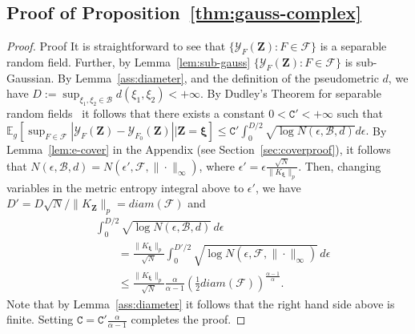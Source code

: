 \documentclass[11pt,leqno]{amsart}
\begin{document}
\subsection{Proof of Proposition~\ref{thm:gauss-complex}}
\begin{proof}{Proof}
It is straightforward to see that $\{\mathcal{Y}_F(\mathbf Z) : F \in \mathcal F\}$ is a separable random field. Further, by Lemma~\ref{lem:sub-gauss} $\{\mathcal{Y}_F(\mathbf Z) : F \in \mathcal F\}$ is sub-Gaussian. By Lemma~\ref{ass:diameter}, and the definition of the pseudometric $d$, we have $ D := \sup_{\xi_1,\xi_2 \in \mathcal{B}} d(\xi_1,\xi_2) < +\infty$. By Dudley's Theorem for separable random fields~\citep[Ch. 11]{Ledoux_1991} it follows that there exists a constant $0 < \mathtt{C}' < + \infty$ such that
\(
    \mathbb E_{g} \left[ \sup_{F \in \mathcal F} |\mathcal{Y}_F(\mathbf Z) - \mathcal{Y}_{F_0}(\mathbf Z)| \bigg | \mathbf Z =  \boldsymbol\xi  \right] \leq \mathtt{C}' \int_0^{D/2} \sqrt{ \log N(\epsilon,\mathcal{B},d)} d\epsilon.
\)
By Lemma~\ref{lem:e-cover} in the Appendix (see Section~\ref{sec:coverproof}), it follows that $N(\epsilon,\mathcal{B},d) = N(\epsilon',\mathcal{F},\|\cdot\|_{\infty})$, where $\epsilon' = \epsilon \frac{\sqrt{N}}{\|K_{ \boldsymbol\xi }\|_{p}}$. Then, changing variables in the metric entropy integral above to $\epsilon'$, we have $D' = D \sqrt{N}/\|K_{\mathbf{Z}}\|_{p} = diam(\mathcal F)$ and
\begin{align*}
    &\int_0^{D/2} \sqrt{ \log N(\epsilon,\mathcal{B},d)} \,d\epsilon\\&\qquad= \frac{\|K_{ \boldsymbol\xi }\|_{p}}{\sqrt{N}} \int_0^{D'/2} \sqrt{\log N(\epsilon,\mathcal{F},\|\cdot\|_{\infty})}\, d \epsilon\\
     & \qquad \leq%
    \frac{\|K_{ \boldsymbol\xi }\|_{p}}{\sqrt{N}} \frac{\alpha}{\alpha-1} \left(\frac{1}{2}diam(\mathcal F)\right)^{\frac{\alpha-1}{\alpha}}.
\end{align*}
Note that by Lemma~\ref{ass:diameter} it follows that the right hand side above is finite. Setting $\mathtt{C} = \mathtt{C}' \frac{\alpha}{\alpha - 1}$ completes the proof.
 
\end{proof}
\end{document}
